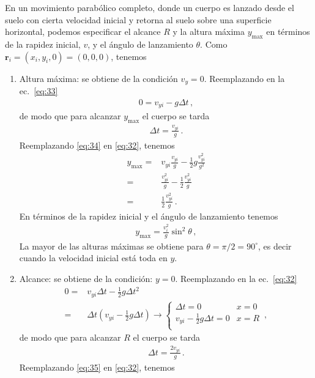 En un movimiento parabólico completo, donde un cuerpo es lanzado desde
el suelo con cierta velocidad inicial y retorna al suelo sobre una
superficie horizontal, podemos especificar el alcance $R$ y la altura
máxima $y_{\text{max}}$ en términos de la rapidez inicial, $v$, y el
ángulo de lanzamiento $\theta$. Como
$\mathbf{r}_i=(x_i,y_i,0)=(0,0,0)$, tenemos
  \begin{enumerate}
  \item Altura máxima: se obtiene de la condición $v_y=0$. Reemplazando en la ec.~\eqref{eq:33}
    \begin{align}
      0=v_{yi}-g\Delta t\,,
    \end{align}
de modo que para alcanzar $y_{\text{max}}$ el cuerpo se tarda
\begin{align}
  \label{eq:34}
  \Delta t=\frac{v_{yi}}{g}\,.
\end{align}
Reemplazando \eqref{eq:34} en \eqref{eq:32}, tenemos
\begin{align}
  y_{\text{max}}=&v_{yi}\frac{v_{yi}}{g}-\frac{1}{2}g\frac{v_{yi}^2}{g^2}\nonumber\\
  =&\frac{v_{yi}^2}{g}-\frac{1}{2}\frac{v_{yi}^2}{g}\nonumber\\
  =&\frac{1}{2}\frac{v_{yi}^2}{g}\,.
\end{align}
En términos de la rapidez inicial y el ángulo de lanzamiento tenemos
\begin{align}
  y_{\text{max}}=\frac{v^2_i}{g}\sin^2\theta\,,
\end{align}
La mayor de las alturas máximas se obtiene para $\theta=\pi/2=90^\circ$, es decir cuando la velocidad inicial está toda en $y$.
\item Alcance: se obtiene de la condición: $y=0$. Reemplazando en la ec.~\eqref{eq:32}
  \begin{align}
    0=&v_{yi}\Delta t-\frac{1}{2}g\Delta t^2\nonumber\\
    =&\Delta t(v_{yi}-\frac{1}{2}g\Delta t)\to
    \begin{cases}
      \Delta t=0 & x=0\\
      v_{yi}-\frac{1}{2}g\Delta t=0 & x=R\\
    \end{cases}
\,,
  \end{align}
de modo que para alcanzar $R$ el cuerpo se tarda
\begin{align}
 \label{eq:35}
  \Delta t=\frac{2v_{yi}}{g}\,.
\end{align}
Reemplazando \eqref{eq:35} en \eqref{eq:32}, tenemos
\begin{align}

\end{align}
\end{enumerate}
